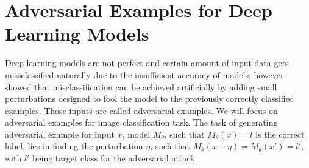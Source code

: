 \chapter{Adversarial Examples for Deep Learning Models}
Deep learning models are not perfect and certain amount of input data gets missclassified naturally due to the insufficient accuracy of models; however \cite{DBLP:journals/corr/SzegedyZSBEGF13} showed that misclassification can be achieved artificially by adding small perturbations designed to fool the model to the previously correctly classified examples. Those inputs are called adversarial examples. We will focus on adversarial examples for image classification task. The task of generating adversarial example for input $x$, model $M_\theta$, such that $M_\theta(x) = l$ is the correct label, lies in finding the perturbation $\eta$, such that $M_\theta(x + \eta) = M_\theta(x') = l'$, with $l'$ being target class for the adversarial attack.

